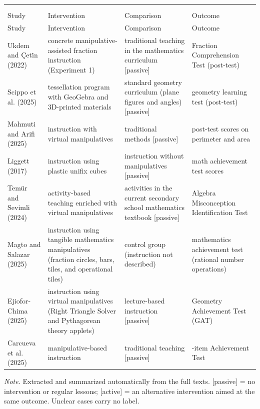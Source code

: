 \documentclass[man,a4paper,12pt,floatsintext,nolmodern,notab]{apa7}
\newcommand{\tablefont}{\small}
\begin{document}
\par\vspace{4pt}
{\tablefont\singlespacing\setlength{\LTpre}{6pt}\setlength{\LTpost}{2pt}
\begin{longtable}{>{\raggedright\arraybackslash}p{0.2000\dimexpr\linewidth-8\tabcolsep\relax}>{\raggedright\arraybackslash}p{0.3200\dimexpr\linewidth-8\tabcolsep\relax}>{\raggedright\arraybackslash}p{0.2400\dimexpr\linewidth-8\tabcolsep\relax}>{\raggedright\arraybackslash}p{0.2400\dimexpr\linewidth-8\tabcolsep\relax}}
\multicolumn{4}{@{}l@{}}{\textbf{Table 2}} \\
\multicolumn{4}{@{}p{\linewidth}@{}}{\textit{Interventions, Comparison Conditions, and Outcome Measures}} \\[3pt]
\toprule
Study & Intervention & Comparison & Outcome \\
\midrule
\endfirsthead
\toprule
Study & Intervention & Comparison & Outcome \\
\midrule
\endhead
Ukdem and Çeti̇n (2022) & concrete manipulative-assisted fraction instruction (Experiment 1) & traditional teaching in the mathematics curriculum [passive] & Fraction Comprehension Test (post-test) \\
Scippo et al. (2025) & tessellation program with GeoGebra and 3D-printed materials & standard geometry curriculum (plane figures and angles) [passive] & geometry learning test (post-test) \\
Mahmuti and Arifi (2025) & instruction with virtual manipulatives & traditional methods [passive] & post-test scores on perimeter and area \\
Liggett (2017) & instruction using plastic unifix cubes & instruction without manipulatives [passive] & math achievement test scores \\
Temür and Sevimli (2024) & activity-based teaching enriched with virtual manipulatives & activities in the current secondary school mathematics textbook [passive] & Algebra Misconception Identification Test \\
Magto and Salazar (2025) & instruction using tangible mathematics manipulatives (fraction circles, bars, tiles, and operational tiles) & control group (instruction not described) & mathematics achievement test (rational number operations) \\
Ejiofor-Chima (2025) & instruction using virtual manipulatives (Right Triangle Solver and Pythagorean theory applets) & lecture-based instruction [passive] & Geometry Achievement Test (GAT) \\
Carcueva et al. (2025) & manipulative-based instruction & traditional teaching [passive] & 40-item Achievement Test \\
\bottomrule
\end{longtable}
\noindent \textit{Note.} Extracted and summarized automatically from the full texts. [passive] = no intervention or regular lessons; [active] = an alternative intervention aimed at the same outcome. Unclear cases carry no label.\par}
\vspace{6pt}
\end{document}
